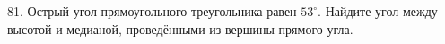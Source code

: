 81. Острый угол прямоугольного треугольника равен $53^\circ.$ Найдите угол между высотой и медианой, проведёнными из вершины прямого угла.\\
